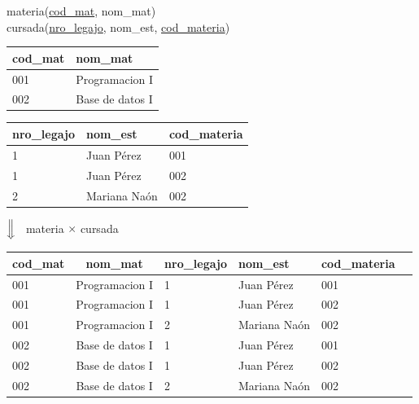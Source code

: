 \documentclass[preview]{standalone}
\begin{document}
materia(\underline{cod\_mat}, nom\_mat)\\
cursada(\underline{nro\_legajo}, nom\_est, \underline{cod\_materia})\\

\begin{center}
\begin{tabular}{| l | l | }\hline			
	cod\_mat & nom\_mat \\\hline			
	001 & Programacion I \\
	002 & Base de datos I \\\hline
\end{tabular}
\quad
\begin{tabular}{| l | l | l | }\hline			
	nro\_legajo & nom\_est & cod\_materia \\\hline			
	1 & Juan P\'erez & 001\\
	1 & Juan P\'erez & 002\\
	2 & Mariana Na\'on & 002 \\\hline
\end{tabular}
\vspace{.35cm}

$\Big\Downarrow$ \ materia $\times$ cursada
\vspace{.35cm}

\begin{tabular}{| l | c | l | l | l | l | }\hline			
	cod\_mat & nom\_mat & nro\_legajo & nom\_est & cod\_materia \\\hline			
	001 & Programacion I & 1 & Juan P\'erez & 001  \\
	001 & Programacion I  & 1 & Juan P\'erez & 002 \\
	001 & Programacion I & 2 & Mariana Na\'on & 002 \\
	002 & Base de datos I & 1 & Juan P\'erez & 001  \\
	002 & Base de datos I & 1 & Juan P\'erez & 002 \\
	002 & Base de datos I & 2 & Mariana Na\'on & 002 \\\hline
\end{tabular}
\end{center}
\end{document}
